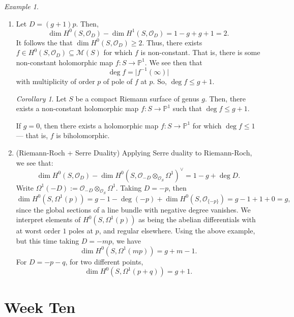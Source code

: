 \documentclass[a4paper]{report}
\theoremstyle{definition}
\theoremstyle{remark}
\theoremstyle{proposition}
\theoremstyle{conjecture}
\theoremstyle{lemma}
\theoremstyle{corollary}
\newtheorem{corollary}{Corollary}
\theoremstyle{exercise}
\theoremstyle{example}
\newtheorem{example}{Example}
\newcommand{\mcal}{\mathcal}
\begin{document}
\begin{example}
    \leavevmode
    \begin{enumerate}
        \item Let $D = (g+1)p$. Then, 
            $$\dim H^0(S,\mcal{O}_D) - \dim H^1(S,\mcal{O}_D) = 1-g + g+ 1 =2.$$
            It follows the that 
            $\dim H^0(S,\mcal{O}_D) \geq 2$. Thus, there exists 
            $f \in H^0(S,\mcal{O}_D) \subseteq \mcal{M}(S)$ for which
            $f$ is non-constant. That is, there is some non-constant holomorphic
            map $f : S \to \mathbb{P}^1$. We see then that 
            $$\deg f = \vert f^{-1}(\infty)\vert$$
            with multiplicity of order $p$ of pole of $f$ at $p$.
            So, $\deg f \leq g + 1$.

            \begin{corollary}
                Let $S$ be a compact Riemann surface of genus $g$.
                Then, there exists a non-constant holomorphic map 
                $f : S \to \mathbb{P}^1$ such that $\deg f \leq g+1$.
            \end{corollary}
            If $g = 0$, then there exists a holomorphic map 
            $f : S \to \mathbb{P}^1$ for which $\deg f \leq 1$ --- 
            that is, $f$ is biholomorphic.
        \item (Riemann-Roch + Serre Duality) 
            Applying Serre duality to Riemann-Roch, we see that:
            $$\dim H^0(S,\mcal{O}_D) - \dim H^0(S,\mcal{O}_{-D}\otimes_{\mcal{O}_S} \Omega^1)^\vee = 1 - g + \deg D.$$
            Write $\Omega^1(-D) := \mcal{O}_{-D} \otimes_{\mcal{O}_S}\Omega^1$.
            Taking $D = -p$, then 
            $$\dim H^0(S,\Omega^1(p)) = g - 1 - \deg(-p) + \dim H^0(S,\mcal{O}_{\lbrace - p\rbrace}) = g - 1 + 1 + 0 = g,$$
            since the global sections of a line bundle with negative degree
            vanishes. We interpret elements of $H^0(S,\Omega^1(p))$ as being
            the abelian differentials with at worst order $1$ poles at $p$, and 
            regular elsewhere. Using the above example, but this time taking 
            $D=-mp$, we have $$\dim H^0(S,\Omega^1(mp)) = g + m -1.$$
            For $D= -p-q$, for two different points,
            $$\dim H^0(S,\Omega^1(p+q)) = g + 1.$$
    \end{enumerate}
\end{example}

\chapter{Week Ten}
\end{document}
